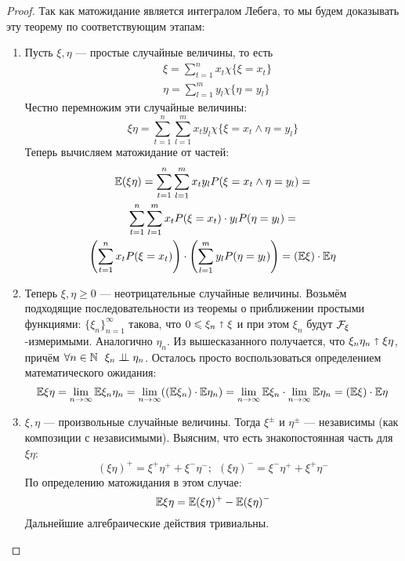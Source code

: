 \begin{proof}
	Так как матожидание является интегралом Лебега, то мы будем доказывать эту теорему по соответствующим этапам:
	\begin{enumerate}
		\item Пусть $\xi, \eta$ --- простые случайные величины, то есть
		\begin{align*}
			&{\xi = \sum_{t = 1}^n x_t \chi\{\xi = x_t\}}
			\\
			&{\eta = \sum_{l = 1}^m y_l \chi\{\eta = y_l\}}
		\end{align*}
		Честно перемножим эти случайные величины:
		\[
			\xi\eta = \sum_{t = 1}^n \sum_{l = 1}^m x_t y_l \chi\{\xi = x_t \wedge \eta = y_l\}
		\]
		Теперь вычисляем матожидание от частей:
		\begin{multline*}
			\mathbb{E}(\xi\eta) = \sum_{t = 1}^n \sum_{l = 1}^m x_t y_l P(\xi = x_t \wedge \eta = y_l) =
			\\
			\sum_{t = 1}^n \sum_{l = 1}^m x_tP(\xi = x_t) \cdot y_lP(\eta = y_l) =
			\\
			\left(\sum_{t = 1}^n x_tP(\xi = x_t)\right) \cdot \left(\sum_{l = 1}^m y_lP(\eta = y_l)\right) = (\mathbb{E}\xi) \cdot \mathbb{E}\eta
		\end{multline*}
		
		\item Теперь $\xi, \eta \ge 0$ --- неотрицательные случайные величины. Возьмём подходящие последовательности из теоремы о приближении простыми функциями: $\{\xi_n\}_{n = 1}^\infty$ такова, что $0 \leqslant \xi_n \shortuparrow \xi$ и при этом $\xi_n$ будут $\mathcal{F}_\xi$-измеримыми. Аналогично $\eta_n$. Из вышесказанного получается, что $\xi_n\eta_n \shortuparrow \xi\eta$, причём $\forall n \in \mathbb{N}\ \ \xi_n \perp\mkern-9.5mu\perp \eta_n$. Осталось просто воспользоваться определением математического ожидания:
		\[
			\mathbb{E}\xi\eta = \lim_{n \to \infty} \mathbb{E}\xi_n\eta_n = \lim_{n \to \infty} ((\mathbb{E}\xi_n) \cdot \mathbb{E}\eta_n) = \lim_{n \to \infty} \mathbb{E}\xi_n \cdot \lim_{n \to \infty} \mathbb{E}\eta_n = (\mathbb{E}\xi) \cdot \mathbb{E}\eta
		\]
		
		\item $\xi, \eta$ --- произвольные случайные величины. Тогда $\xi^{\pm}$ и $\eta^{\pm}$ --- независимы (как композиции с независимыми). Выясним, что есть знакопостоянная часть для $\xi\eta$:
		\[
			(\xi\eta)^+ = \xi^+ \eta^+ + \xi^-\eta^-;\ \ (\xi\eta)^- = \xi^-\eta^+ + \xi^+\eta^-
		\]
		По определению матожидания в этом случае:
		\[
			\mathbb{E}\xi\eta = \mathbb{E}(\xi\eta)^+ - \mathbb{E}(\xi\eta)^-
		\]
		Дальнейшие алгебраические действия тривиальны.
	\end{enumerate}
\end{proof}

